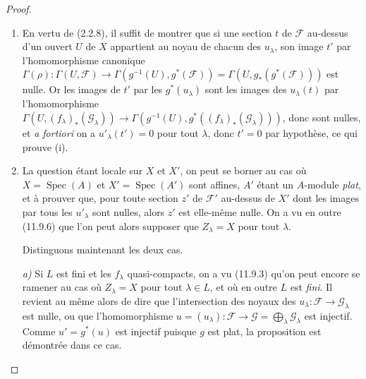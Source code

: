 \begin{proof}
\begin{enumerate}[label=(\roman*)]
  \item En vertu de (2.2.8), il suffit de montrer que si une section $t$ de
  $\mathcal F$ au-dessus d'un ouvert $U$ de $X$ appartient au noyau de chacun
  des $u_\lambda$, son image $t'$ par l'homomorphisme canonique
  $\Gamma(\rho):\Gamma(U,\mathcal F)\longrightarrow
  \Gamma(g^{-1}(U),g^*(\mathcal F))
  =\Gamma(U,g_*(g^*(\mathcal F)))$
  est nulle. Or les images de $t'$ par les $g^*(u_\lambda)$ sont les images
  des $u_\lambda(t)$ par l'homomorphisme
  $\Gamma(U,(f_\lambda)_*(\mathcal G_\lambda))\longrightarrow
  \Gamma(g^{-1}(U),g^*((f_\lambda)_*(\mathcal G_\lambda)))$,
  donc sont nulles, et \emph{a fortiori} on a $u'_\lambda(t')=0$ pour tout
  $\lambda$, donc $t'=0$ par hypothèse, ce qui prouve (i).

  \item La question étant locale sur $X$ et $X'$, on peut se borner au cas où
  $X=\operatorname{Spec}(A)$ et $X'=\operatorname{Spec}(A')$ sont affines,
  $A'$ étant un $A$-module \emph{plat}, et à prouver que, pour toute section $z'$ de
  $\mathcal F'$ au-dessus de $X'$ dont les images par tous les $u'_\lambda$
  sont nulles, alors $z'$ est elle-même nulle. On a vu en outre (11.9.6) que
  l'on peut alors supposer que $Z_\lambda=X$ pour tout $\lambda$.

  Distinguons maintenant les deux cas.

  \emph{a)} Si $L$ est fini et les $f_\lambda$ quasi-compacts, on a vu (11.9.3)
  qu'on peut encore se ramener au cas où $Z_\lambda=X$ pour tout
  $\lambda\in L$, et où en outre $L$ est \emph{fini}. Il revient au même alors de dire
  que l'intersection des noyaux des
  $u_\lambda:\mathcal F\to\mathcal G_\lambda$ est nulle, ou que
  l'homomorphisme
  $u=(u_\lambda):\mathcal F\to\mathcal G=\bigoplus_\lambda\mathcal G_\lambda$
  est injectif. Comme $u'=g^*(u)$ est injectif puisque $g$ est plat, la
  proposition est démontrée dans ce cas.


\end{enumerate}
\end{proof}
